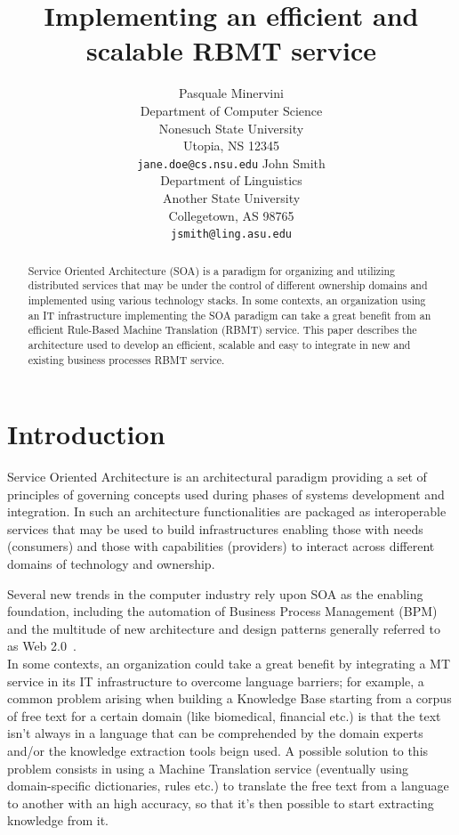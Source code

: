 \documentclass[11pt]{article}
\title{Implementing an efficient and scalable RBMT service}
\author{Pasquale Minervini\\
  Department of Computer Science \\
  Nonesuch State University \\
  Utopia, NS 12345 \\
  {\tt jane.doe@cs.nsu.edu} \And
  John Smith \\
  Department of Linguistics \\
  Another State University \\
  Collegetown, AS 98765 \\  
  {\tt jsmith@ling.asu.edu}}
\date{}
\begin{document}
\maketitle

\begin{abstract}
Service Oriented Architecture (SOA) is a paradigm for organizing and utilizing distributed services that may be under the 
control of different ownership domains and implemented using various technology stacks. In some contexts, an organization
using an IT infrastructure implementing the SOA paradigm can take a great benefit from an efficient Rule-Based Machine 
Translation (RBMT) service. This paper describes the architecture used to develop an efficient, scalable and easy to integrate
in new and existing business processes RBMT service.
\end{abstract}

\section{Introduction}

Service Oriented Architecture is an architectural paradigm providing  a set of principles of governing concepts used during phases 
of systems development and integration. In such an architecture functionalities are packaged as interoperable services that may be 
used to build infrastructures enabling those with needs (consumers) and those with capabilities (providers) to interact across 
different domains of technology and ownership.

Several new trends in the computer industry rely upon SOA as the enabling foundation, including the automation of Business Process 
Management (BPM) and the multitude of new architecture and design patterns generally referred to as Web 2.0~\cite{web20}.\\

In some contexts, an organization could take a great benefit by integrating a MT service in its IT infrastructure to overcome 
language barriers; for example, a common problem arising when building a Knowledge Base starting from a corpus of free text for
a certain domain (like biomedical, financial etc.) is that the text isn't always in a language that can be comprehended by the
domain experts and/or the knowledge extraction tools beign used. A possible solution to this problem consists in using a Machine
Translation service (eventually using domain-specific dictionaries, rules etc.) to translate the free text from a language to
another with an high accuracy, so that it's then possible to start extracting knowledge from it.\\
\end{document}

